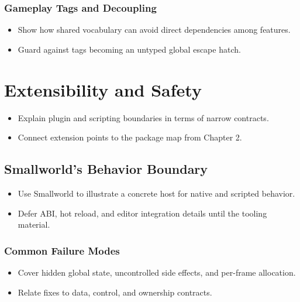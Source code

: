 \documentclass[
  11pt,
  letterpaper,
  DIV=11,
  numbers=noendperiod,
  twoside,
  open=right]{scrreprt}
\providecommand{\tightlist}{%
  \setlength{\itemsep}{0pt}\setlength{\parskip}{0pt}}
\begin{document}
\subsubsection{Gameplay Tags and
Decoupling}\label{gameplay-tags-and-decoupling}

\begin{itemize}
\tightlist
\item
  Show how shared vocabulary can avoid direct dependencies among
  features.
\item
  Guard against tags becoming an untyped global escape hatch.
\end{itemize}

\section{Extensibility and Safety}\label{extensibility-and-safety}

\begin{itemize}
\tightlist
\item
  Explain plugin and scripting boundaries in terms of narrow contracts.
\item
  Connect extension points to the package map from Chapter 2.
\end{itemize}

\subsection{Smallworld's Behavior
Boundary}\label{smallworlds-behavior-boundary}

\begin{itemize}
\tightlist
\item
  Use Smallworld to illustrate a concrete host for native and scripted
  behavior.
\item
  Defer ABI, hot reload, and editor integration details until the
  tooling material.
\end{itemize}

\subsubsection{Common Failure Modes}\label{common-failure-modes}

\begin{itemize}
\tightlist
\item
  Cover hidden global state, uncontrolled side effects, and per-frame
  allocation.
\item
  Relate fixes to data, control, and ownership contracts.
\end{itemize}
\end{document}
